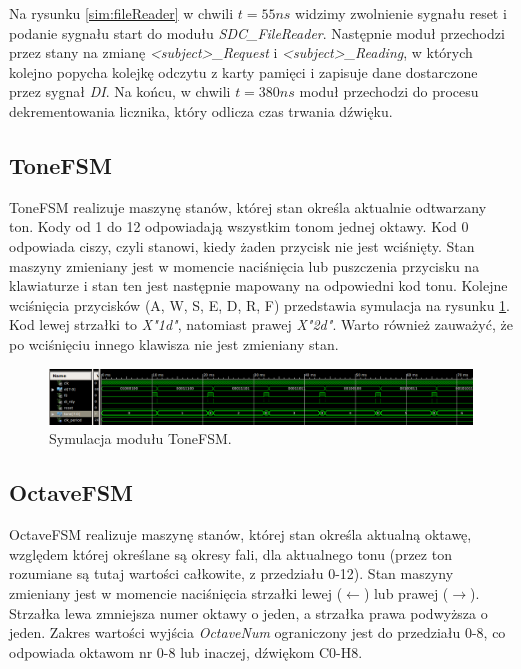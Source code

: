 \documentclass[a4paper,12pt]{article}
\begin{document}
Na rysunku \ref{sim:fileReader} w chwili $t=55ns$ widzimy zwolnienie sygnału reset i podanie sygnału start do modułu \textit{SDC\_FileReader}. Następnie moduł przechodzi przez stany na zmianę \textit{<subject>\_Request} i \textit{<subject>\_Reading}, w których kolejno popycha kolejkę odczytu z karty pamięci i zapisuje dane dostarczone przez sygnał \textit{DI}. Na końcu, w chwili $t=380ns$ moduł przechodzi do procesu dekrementowania licznika, który odlicza czas trwania dźwięku.


\subsection{ToneFSM}
ToneFSM realizuje maszynę stanów, której stan określa aktualnie odtwarzany ton.
Kody od 1 do 12 odpowiadają wszystkim tonom jednej oktawy. Kod 0 odpowiada ciszy, czyli stanowi, kiedy żaden przycisk nie jest wciśnięty. Stan maszyny zmieniany jest w momencie naciśnięcia lub puszczenia przycisku na klawiaturze i stan ten jest następnie mapowany na odpowiedni kod tonu. Kolejne wciśnięcia przycisków (A, W, S, E, D, R, F) przedstawia symulacja na rysunku \ref{sim:tone}. Kod lewej strzałki to \textit{X"1d"}, natomiast prawej \textit{X"2d"}. Warto również zauważyć, że po wciśnięciu innego klawisza nie jest zmieniany stan.

\begin{figure}[H]
  \centering
  \includegraphics[decodearray={1 0 1 0 1 0}, width=\linewidth]{images/tone}
  \caption{Symulacja modułu ToneFSM.}
  \label{sim:tone}
\end{figure}

\clearpage
\subsection{OctaveFSM}

OctaveFSM realizuje maszynę stanów, której stan określa aktualną oktawę, względem której określane są okresy fali, dla aktualnego tonu (przez ton rozumiane są tutaj wartości całkowite, z przedziału 0-12). Stan maszyny zmieniany jest w momencie naciśnięcia strzałki lewej ($\leftarrow$) lub prawej ($\rightarrow$). Strzałka lewa zmniejsza numer oktawy o jeden, a strzałka prawa podwyższa o jeden. Zakres wartości wyjścia \textit{OctaveNum} ograniczony jest do przedziału 0-8, co odpowiada oktawom nr 0-8 lub inaczej, dźwiękom C0-H8. 
\end{document}

